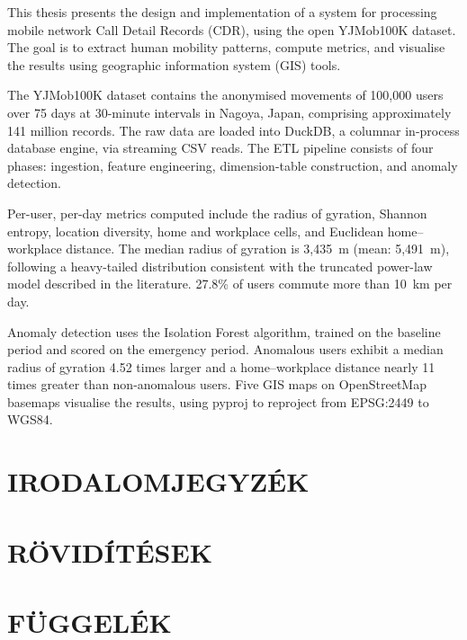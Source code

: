 This thesis presents the design and implementation of a system for processing mobile network Call Detail Records (CDR), using the open YJMob100K dataset. The goal is to extract human mobility patterns, compute metrics, and visualise the results using geographic information system (GIS) tools.

The YJMob100K dataset contains the anonymised movements of 100,000 users over 75 days at 30-minute intervals in Nagoya, Japan, comprising approximately 141 million records. The raw data are loaded into DuckDB, a columnar in-process database engine, via streaming CSV reads. The ETL pipeline consists of four phases: ingestion, feature engineering, dimension-table construction, and anomaly detection.

Per-user, per-day metrics computed include the radius of gyration, Shannon entropy, location diversity, home and workplace cells, and Euclidean home--workplace distance. The median radius of gyration is 3,435~m (mean: 5,491~m), following a heavy-tailed distribution consistent with the truncated power-law model described in the literature. 27.8\% of users commute more than 10~km per day.

Anomaly detection uses the Isolation Forest algorithm, trained on the baseline period and scored on the emergency period. Anomalous users exhibit a median radius of gyration 4.52 times larger and a home--workplace distance nearly 11 times greater than non-anomalous users. Five GIS maps on OpenStreetMap basemaps visualise the results, using pyproj to reproject from EPSG:2449 to WGS84.












\clearpage
\section{IRODALOMJEGYZÉK}
\printbibliography[heading=none]

\clearpage
\renewcommand{\listfigurename}{ÁBRAJEGYZÉK}
\listoffigures


\clearpage
\section{RÖVIDÍTÉSEK}



\clearpage
\section*{FÜGGELÉK}



